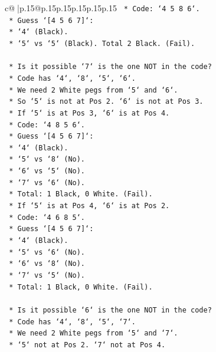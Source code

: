 \documentclass{article}
\begin{document}
{\begin{supertabular}{c@{$\;$}|p{.15\linewidth}@{}p{.15\linewidth}p{.15\linewidth}p{.15\linewidth}p{.15\linewidth}p{.15\linewidth}}
{{{\texttt{        *   Code: `4 5 8 6`.} \\
\texttt{        *   Guess `{[}4 5 6 7{]}`:} \\
\texttt{            *   `4` (Black).} \\
\texttt{            *   `5` vs `5` (Black). Total 2 Black. (Fail).} \\
\\ 
\texttt{    *   Is it possible `7` is the one NOT in the code?} \\
\texttt{        *   Code has `4`, `8`, `5`, `6`.} \\
\texttt{        *   We need 2 White pegs from `5` and `6`.} \\
\texttt{        *   So `5` is not at Pos 2. `6` is not at Pos 3.} \\
\texttt{        *   If `5` is at Pos 3, `6` is at Pos 4.} \\
\texttt{        *   Code: `4 8 5 6`.} \\
\texttt{        *   Guess `{[}4 5 6 7{]}`:} \\
\texttt{            *   `4` (Black).} \\
\texttt{            *   `5` vs `8` (No).} \\
\texttt{            *   `6` vs `5` (No).} \\
\texttt{            *   `7` vs `6` (No).} \\
\texttt{            *   Total: 1 Black, 0 White. (Fail).} \\
\texttt{        *   If `5` is at Pos 4, `6` is at Pos 2.} \\
\texttt{        *   Code: `4 6 8 5`.} \\
\texttt{        *   Guess `{[}4 5 6 7{]}`:} \\
\texttt{            *   `4` (Black).} \\
\texttt{            *   `5` vs `6` (No).} \\
\texttt{            *   `6` vs `8` (No).} \\
\texttt{            *   `7` vs `5` (No).} \\
\texttt{            *   Total: 1 Black, 0 White. (Fail).} \\
\\ 
\texttt{    *   Is it possible `6` is the one NOT in the code?} \\
\texttt{        *   Code has `4`, `8`, `5`, `7`.} \\
\texttt{        *   We need 2 White pegs from `5` and `7`.} \\
\texttt{        *   `5` not at Pos 2. `7` not at Pos 4.} \\
}}}
\end{supertabular}}
\end{document}
